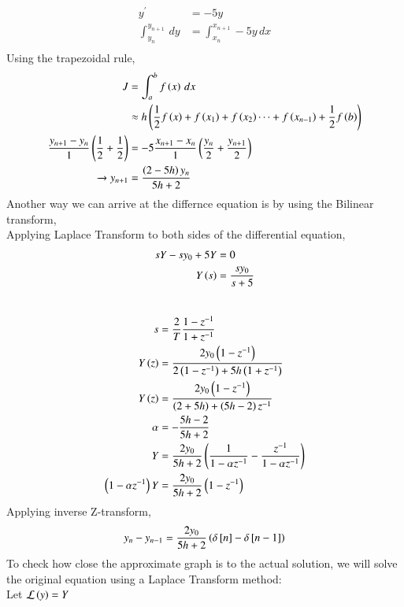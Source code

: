 \documentclass[journal]{IEEEtran}
\begin{document}
\begin{align}
    y^{\prime} &= -5y \\
    \int_{y_n}^{y_{n+1}} \, dy &= \int_{x_n}^{x_{n+1}} -5y \, dx\\
\end{align}
Using the trapezoidal rule,
\begin{align}
    J &= \int_a^b f\left(x\right)\, dx\\
    &\approx h\left(\frac{1}{2}f\left(x\right) + f\left(x_1\right) + f\left(x_2\right) \cdots + f\left(x_{n-1}\right) + \frac{1}{2}f\left(b\right)\right)\\
    \frac{y_{n+1} - y_n}{1}\left(\frac{1}{2} + \frac{1}{2}\right)
    &= -5\frac{x_{n+1} - x_{n}}{1}\left(\frac{y_n}{2} +\frac{y_{n+1}}{2}\right) \\ 
    \xrightarrow{} y_{n+1} &= \frac{\left(2-5h\right)y_n}{5h+2} 
\end{align}
Another way we can arrive at the differnce equation is by using the Bilinear transform,\\
Applying Laplace Transform to both sides of the differential equation,
\begin{align}
    sY - sy_0 + 5Y &= 0\\
    Y\left(s\right) &= \frac{sy_0}{s+5}\\
\end{align}
    \\
\begin{align}
    s &= \frac{2}{T} \frac{1-z^{-1}}{1+z^{-1}}\\
    Y\left(z\right) &= \frac{2y_0\left(1 - z^{-1}\right)}{2\left(1 - z^{-1}\right) + 5h\left(1 + z^{-1}\right)}\\
    Y\left(z\right) &= \frac{2y_0\left(1 - z^{-1}\right)}{\left(2+5h\right) + \left(5h-2\right)z^{-1}}\\
    \alpha &= -\frac{5h-2}{5h+2}\\
    Y &= \frac{2y_0}{5h+2}\left(\frac{1}{1- \alpha z^{-1}} - \frac{z^{-1}}{1 - \alpha z^{-1}}\right)\\
    \left(1 -\alpha z^{-1}\right)Y &= \frac{2y_0}{5h+2}\left(1-z^{-1}\right)
\end{align}
Applying inverse Z-transform,
\begin{align}
    y_n - y_{n-1} &=   \frac{2y_0}{5h+2}\left(\delta {}\left[n\right] - \delta {}\left[n-1\right]\right)\\
\end{align}
To check how close the approximate graph is to the actual solution, we will solve the original 
equation using a Laplace Transform method:\\
Let $\mathcal{L}\left(y\right) = Y$\\
\end{document}
